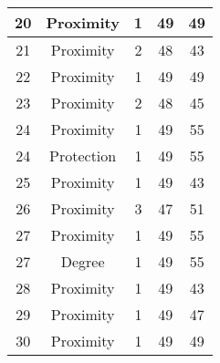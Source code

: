 \documentclass[results.tex]{subfiles}
\begin{document}
\begin{center}
\begin{tabular}{| c || c | c | c | c |}
            \hline
            20                      & Proximity                    & 1                      & 49                      & 49                   \\
            \hline
            21                      & Proximity                    & 2                      & 48                      & 43                   \\
            \hline
            22                      & Proximity                    & 1                      & 49                      & 49                   \\
            \hline
            23                      & Proximity                    & 2                      & 48                      & 45                   \\
            \hline
            24                      & Proximity                    & 1                      & 49                      & 55                   \\
            \hline
            24                      & Protection                   & 1                      & 49                      & 55                   \\
            \hline
            25                      & Proximity                    & 1                      & 49                      & 43                   \\
            \hline
            26                      & Proximity                    & 3                      & 47                      & 51                   \\
            \hline
            27                      & Proximity                    & 1                      & 49                      & 55                   \\
            \hline
            27                      & Degree                       & 1                      & 49                      & 55                   \\
            \hline
            28                      & Proximity                    & 1                      & 49                      & 43                   \\
            \hline
            29                      & Proximity                    & 1                      & 49                      & 47                   \\
            \hline
            30                      & Proximity                    & 1                      & 49                      & 49                   \\

\end{tabular}
\end{center}
\end{document}
